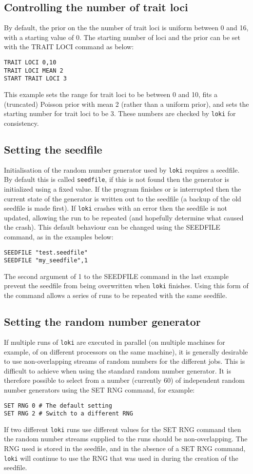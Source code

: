 \documentclass[10pt,a4paper]{article}
\newcommand{\Loki}{\texttt{loki}\xspace}
\begin{document}
\subsection{Controlling the number of trait loci}
By default, the prior on the the number of trait loci is uniform between 0 and
16, with a starting value of 0.  The starting number of loci and the prior can
be set with the TRAIT LOCI command as below:
\begin{verbatim}
TRAIT LOCI 0,10
TRAIT LOCI MEAN 2
START TRAIT LOCI 3
\end{verbatim}
This example sets the range for trait loci to be between 0 and 10, fits a
(truncated) Poisson prior with mean 2 (rather than a uniform prior), and sets
the starting number for trait loci to be 3.  These numbers are checked by \Loki
for consistency.
\subsection{Setting the seedfile}
Initialisation of the random number generator used by \Loki requires a
seedfile.  By default this is called \verb+seedfile+, if this is not found
then the generator is initialized using a fixed value.  If the program
finishes or is interrupted then the current state of the generator is
written out to the seedfile (a backup of the old seedfile is made first).
If \Loki crashes with an error then the seedfile is not updated, allowing
the run to be repeated (and hopefully determine what caused the crash).
This default behaviour can be changed using the SEEDFILE command, as in the
examples below:
\begin{verbatim}
SEEDFILE "test.seedfile"
SEEDFILE "my_seedfile",1
\end{verbatim}
The second argument of 1 to the SEEDFILE command in the last example prevent
the seedfile from being overwritten when \Loki finishes.  Using this form of
the command allows a series of runs to be repeated with the same seedfile.
\subsection{Setting the random number generator}
If multiple runs of \Loki are executed in parallel (on multiple machines for
example, of on different processors on the same machine), it is generally
desirable to use non-overlapping streams of random numbers for the different
jobs.  This is difficult to achieve when using the standard random number
generator.  It is therefore possible to select from a number (currently 60)
of independent random number generators using the SET RNG command, for
example:
\begin{verbatim}
SET RNG 0 # The default setting
SET RNG 2 # Switch to a different RNG 
\end{verbatim}
If two different \Loki runs use different values for the SET RNG command then
the random number streams supplied to the runs should be non-overlapping.
The RNG used is stored in the seedfile, and in the absence of a SET RNG
command, \Loki will continue to use the RNG that was used in during the
creation of the seedfile.
\end{document}
